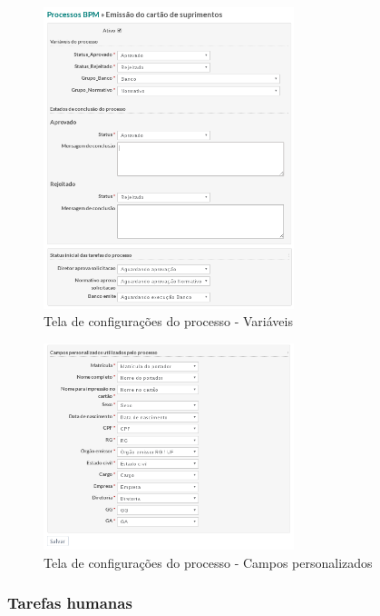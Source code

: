 \begin{figure}[H]
\centering
\includegraphics[width=0.65\textwidth]{imagens/plugin_process_settings1.png}
\caption{Tela de configurações do processo - Variáveis}
\label{fig:plugin_process_settings_variables}
\end{figure}

\begin{figure}[H]
\centering
\includegraphics[width=0.65\textwidth]{imagens/plugin_process_settings2.png}
\caption{Tela de configurações do processo - Campos personalizados}
\label{fig:plugin_process_settings_form_fields}
\end{figure}

\subsubsection{Tarefas humanas}\label{sec:integracao_redmine_activiti_sincronizacao-criacao_human_task}

